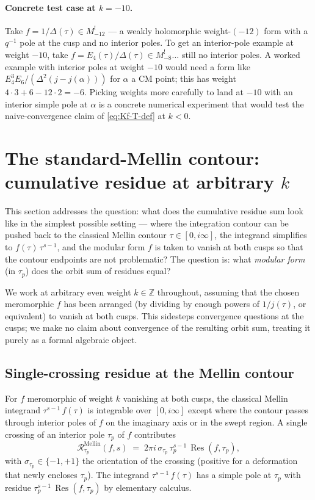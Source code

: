 \documentclass[11pt]{article}
\newcommand{\ZZ}{\mathbb{Z}}
\DeclareMathOperator{\Res}{Res}
\begin{document}
\paragraph{Concrete test case at $k = -10$.}
Take $f = 1/\Delta(\tau) \in M_{-12}^!$ — a weakly holomorphic
weight-$(-12)$ form with a $q^{-1}$ pole at the cusp and no interior
poles.  To get an interior-pole example at weight $-10$, take
$f = E_4(\tau)/\Delta(\tau) \in M_{-8}^!$... still no interior poles.
A worked example with interior poles at weight $-10$ would need a
form like $E_4^3 E_6 / (\Delta^2 (j - j(\alpha)))$ for $\alpha$ a CM
point; this has weight $4 \cdot 3 + 6 - 12 \cdot 2 = -6$.  Picking
weights more carefully to land at $-10$ with an interior simple pole
at $\alpha$ is a concrete numerical experiment that would test the
naive-convergence claim of \eqref{eq:Kf-T-def} at $k < 0$.

\section{The standard-Mellin contour: cumulative residue at arbitrary $k$}\label{sec:standard-Mellin-cumulative}

This section addresses the question: what does the cumulative residue
sum look like in the simplest possible setting --- where the
integration contour can be pushed back to the classical Mellin contour
$\tau \in [0, i\infty]$, the integrand simplifies to
$f(\tau)\,\tau^{s-1}$, and the modular form $f$ is taken to vanish at
both cusps so that the contour endpoints are not problematic?  The
question is: what \emph{modular form} (in $\tau_p$) does the orbit sum
of residues equal?

We work at arbitrary even weight $k \in \ZZ$ throughout, assuming that
the chosen meromorphic $f$ has been arranged (by dividing by enough
powers of $1/j(\tau)$, or equivalent) to vanish at both cusps.  This
sidesteps convergence questions at the cusps; we make no claim about
convergence of the resulting orbit sum, treating it purely as a formal
algebraic object.

\subsection{Single-crossing residue at the Mellin contour}\label{subsec:mellin-single}

For $f$ meromorphic of weight $k$ vanishing at both cusps, the
classical Mellin integrand $\tau^{s-1}\,f(\tau)$ is integrable over
$[0, i\infty]$ except where the contour passes through interior poles
of $f$ on the imaginary axis or in the swept region.  A single
crossing of an interior pole $\tau_p$ of $f$ contributes
\begin{equation}\label{eq:mellin-single-residue}
  \mathcal{R}^{\mathrm{Mellin}}_{\tau_p}(f, s)
  \;=\; 2\pi i\,\sigma_{\tau_p}\,\tau_p^{s - 1}\,\Res(f, \tau_p),
\end{equation}
with $\sigma_{\tau_p} \in \{-1, +1\}$ the orientation of the crossing
(positive for a deformation that newly encloses $\tau_p$).  The
integrand $\tau^{s-1}\,f(\tau)$ has a simple pole at $\tau_p$ with
residue $\tau_p^{s-1}\,\Res(f, \tau_p)$ by elementary calculus.
\end{document}
